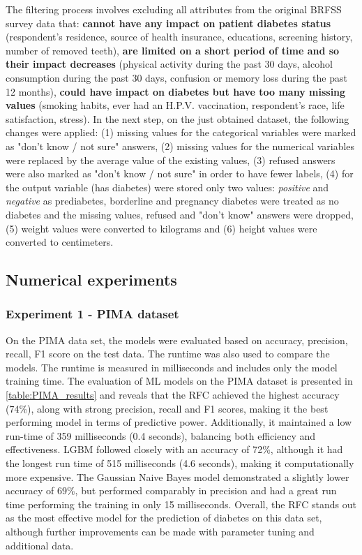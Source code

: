 \documentclass[runningheads]{llncs}
\begin{document}
The filtering process involves excluding all attributes from the original BRFSS survey data that:
\textbf{cannot have any impact on patient diabetes status} (respondent's residence, source of health insurance, educations, screening history, number of removed teeth), 
\textbf{are limited on a short period of time and so their impact decreases} (physical activity during the past 30 days, alcohol consumption during the past 30 days, confusion or memory loss during the past 12 months), 
\textbf{could have impact on diabetes but have too many missing values} (smoking habits, ever had an H.P.V. vaccination, respondent's race, life satisfaction, stress). 
In the next step, on the just obtained dataset, the following changes were applied: 
(1) missing values for the  categorical variables  were marked as "don't know / not sure" answers, 
(2) missing values for the numerical variables were replaced by the average value of the existing values, 
(3) refused answers were also marked as "don't know / not sure" in order to have fewer labels, 
(4) for the output variable (has diabetes) were stored only two values: \textit{positive} and \textit{negative} as prediabetes, borderline and pregnancy diabetes were treated as no diabetes and the missing values, refused and "don't know" answers were dropped, 
(5) weight values were converted to kilograms and 
(6) height values were converted to centimeters.


\subsection{Numerical experiments}

\subsubsection{Experiment 1 - PIMA dataset}

On the PIMA data set, the models were evaluated based on accuracy, precision, recall, F1 score on the test data. The runtime was also used to compare the models. The runtime is measured in milliseconds and includes only the model training time. 
The evaluation of ML models on the PIMA dataset is presented in \autoref{table:PIMA_results} and reveals that the RFC achieved the highest accuracy (74\%), along with strong precision, recall and F1 scores, making it the best performing model in terms of predictive power. Additionally, it maintained a low run-time of 359 milliseconds (0.4 seconds), balancing both efficiency and effectiveness.
LGBM followed closely with an accuracy of 72\%, although it had the longest run time of 515 milliseconds (4.6 seconds), making it computationally more expensive.
The Gaussian Naive Bayes model demonstrated a slightly lower accuracy of 69\%, but performed comparably in precision and had a great run time performing the training in only 15 milliseconds. 
Overall, the RFC stands out as the most effective model for the prediction of diabetes on this data set, although further improvements can be made with parameter tuning and additional data.
\end{document}
